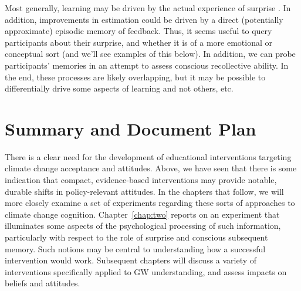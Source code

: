 Most generally, learning may be driven by the actual experience of surprise
\parencite[e.g.,][]{munnich_longevities_2005,kang_wick_2009}.  In addition,
improvements in estimation could be driven by a direct (potentially approximate)
episodic memory of feedback. Thus, it seems useful to query participants about
their surprise, and whether it is of a more emotional or conceptual sort (and
we'll see examples of this below). In addition, we can probe participants'
memories in an attempt to assess conscious recollective ability. In the end, these
processes are likely overlapping, but it may be possible to differentially drive
some aspects of learning and not others, etc.

\section{Summary and Document Plan}

There is a clear need for the development of educational interventions targeting
climate change acceptance and attitudes. Above, we have seen that there is some
indication that compact, evidence-based interventions may provide notable,
durable shifts in policy-relevant attitudes. In the chapters that follow, we
will more closely examine a set of experiments regarding these sorts of
approaches to climate change cognition. Chapter~\ref{chap:two} reports on an
experiment that illuminates some aspects of the psychological processing of such
information, particularly with respect to the role of surprise and conscious
subsequent memory. Such notions may be central to understanding how a successful
intervention would work. Subsequent chapters will discuss a variety of
interventions specifically applied to GW understanding, and assess impacts on
beliefs and attitudes.



